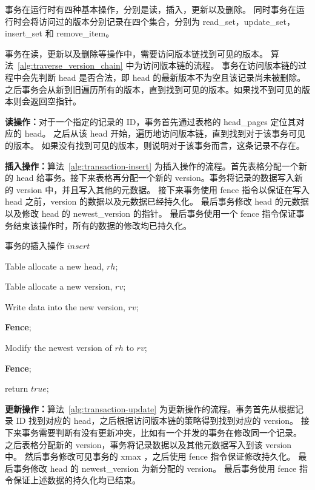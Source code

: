 事务在运行时有四种基本操作，分别是读，插入，更新以及删除。
同时事务在运行时会将访问过的版本分别记录在四个集合，分别为 read\_set，update\_set，insert\_set 和 remove\_item。

事务在读，更新以及删除等操作中，需要访问版本链找到可见的版本。
算法~\ref{alg:traverse_version_chain} 中为访问版本链的流程。
事务在访问版本链的过程中会先判断 head 是否合法，即 head 的最新版本不为空且该记录尚未被删除。之后事务会从新到旧遍历所有的版本，直到找到可见的版本。如果找不到可见的版本则会返回空指针。


\textbf{读操作：}对于一个指定的记录的 ID，事务首先通过表格的 head\_pages 定位其对应的 head。
之后从该 head 开始，遍历地访问版本链，直到找到对于该事务可见的版本。
如果没有找到可见的版本，则说明对于该事务而言，这条记录不存在。


\textbf{插入操作：}算法~\ref{alg:transaction-insert} 为插入操作的流程。首先表格分配一个新的 head 给事务。接下来表格再分配一个新的 version。事务将记录的数据写入新的 version 中，并且写入其他的元数据。
接下来事务使用 fence 指令以保证在写入 head 之前，version 的数据以及元数据已经持久化。
最后事务修改 head 的元数据以及修改 head 的 newest\_version 的指针。
最后事务使用一个 fence 指令保证事务结束该操作时，所有的数据的修改均已持久化。

\begin{algorithm}[h]
    \caption{事务的插入操作 $insert$}
    \label{alg:transaction-insert}
    \BlankLine
    Table allocate a new head, $rh$;

    Table allocate a new version, $rv$;

    Write data into the new version, $rv$;

    \textbf{Fence};

    Modify the newest version of $rh$ to $rv$;

    \textbf{Fence};

    return $true$;

\end{algorithm}

\textbf{更新操作：}算法~\ref{alg:transaction-update} 为更新操作的流程。事务首先从根据记录 ID 找到对应的 head，之后根据访问版本链的策略得到找到对应的 version。
接下来事务需要判断有没有更新冲突，比如有一个并发的事务在修改同一个记录。
之后表格分配新的 version，事务将记录数据以及其他元数据写入到该 version 中。
然后事务修改可见事务的 xmax ，之后使用 fence 指令保证修改持久化。
最后事务修改 head 的 newest\_version 为新分配的 version。
最后事务使用 fence 指令保证上述数据的持久化均已结束。

